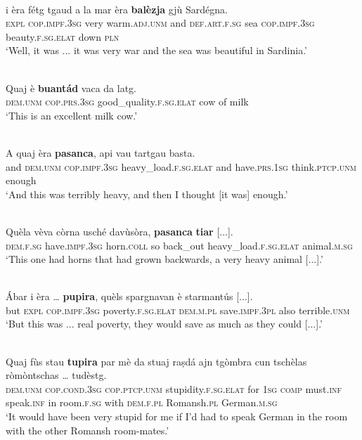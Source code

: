  
\ea\label{}
\\
	\gll  [...] i èra fétg tgaud a la mar èra \textbf{balèzja} gjù Sardégna.\\
{} \textsc{expl} \textsc{cop.impf.3sg} very warm.\textsc{adj.unm} and \textsc{def.art.f.sg} sea \textsc{cop.impf.3sg} beauty.\textsc{f.sg.elat} down \textsc{pln}\\
\glt `Well, it was ... it was very war and the sea was beautiful in Sardinia.'
\z

\ea\label{}
\\
\gll  Quaj è \textbf{buantád} vaca da latg. \\
\textsc{dem.unm} \textsc{cop.prs.3sg} good\_quality.\textsc{f.sg.elat} cow of milk\\
\glt `This is an excellent milk cow.'
\z

\ea
\label{}
\\
\gll  A quaj èra \textbf{pasanca}, api vau tartgau basta.\\
and \textsc{dem.unm} \textsc{cop.impf.3sg} heavy\_load.\textsc{f.sg.elat} and have.\textsc{prs.1sg} think.\textsc{ptcp.unm} enough  \\
\glt `And this was terribly heavy, and then I thought [it was] enough.'
\z

\ea
\label{}
\\
	\gll  Quèla vèva còrna usché davùsòra, \textbf{pasanca} \textbf{tiar} [...].  \\
\textsc{dem.f.sg} have.\textsc{impf.3sg} horn.\textsc{coll} so back\_out heavy\_load.\textsc{f.sg.elat} animal.\textsc{m.sg} \\
\glt `This one had horns that had grown backwards, a very heavy animal [...].'
\z

\ea\label{}
\\
\gll   Ábar i èra … \textbf{pupira}, quèls spargnavan è starmantús [...].\\
but \textsc{expl}  \textsc{cop.impf.3sg} poverty.\textsc{f.sg.elat} {} \textsc{dem.m.pl} save.\textsc{impf.3pl} also terrible.\textsc{unm}\\
\glt `But this was ... real poverty, they would save as much as they could [...].'
\z

\ea
\label{}
\\
\gll    Quaj fùs stau \textbf{tupira} par mè da stuaj raṣdá ajn tgòmbra cun tschèlas ròmòntschas … tudèstg.\\
\textsc{dem.unm} \textsc{cop.cond.3sg} \textsc{cop.ptcp.unm} stupidity.\textsc{f.sg.elat}  for \textsc{1sg} \textsc{comp} must.\textsc{inf} speak.\textsc{inf} in room.\textsc{f.sg} with \textsc{dem.f.pl} Romansh.\textsc{pl} {} German.\textsc{m.sg}\\
\glt `It would have been very stupid for me if I'd had to speak German in the room with the other Romansh room-mates.'
\z

